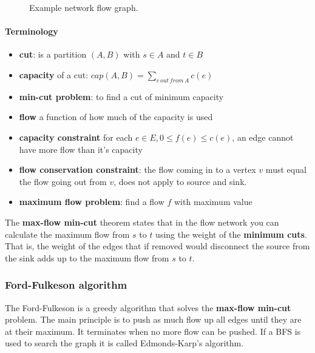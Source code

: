 \documentclass[12pt]{article} %
\begin{document}
\begin{figure}[H]
\caption{Example network flow graph.}
\label{flow}
\end{figure} 

\paragraph{Terminology}
\begin{itemize}
    \item \textbf{cut}: is a partition $(A, B)$ with $s \in A$ and $t \in B$
    \item \textbf{capacity} of a cut: $cap(A, B) = \sum_{e \, out \, from\, A} c(e)$
    \item \textbf{min-cut problem}: to find a cut of minimum capacity
    \item \textbf{flow} a function of how much of the capacity is used
    \item \textbf{capacity constraint} for each $e \in E, 0 \leq f(e) \leq c(e)$, an edge cannot have more flow than it's capacity
    \item \textbf{flow conservation constraint}: the flow coming in to a vertex $v$ must equal the flow going out from $v$, does not apply to source and sink.
    \item \textbf{maximum flow problem}: find a flow $f$ with maximum value
\end{itemize}

\par The \textbf{max-flow min-cut} theorem states that in the flow network you can calculate the maximum flow from $s$ to $t$ using the weight of the \textbf{minimum cuts}. That is, the weight of the edges that if removed would disconnect the source from the sink adds up to the maximum flow from $s$ to $t$.

\subsubsection{Ford-Fulkeson algorithm}
The Ford-Fulkeson is a greedy algorithm that solves the \textbf{max-flow min-cut} problem. The main principle is to push as much flow up all edges until they are at their maximum. It terminates when no more flow can be pushed. If a BFS is used to search the graph it is called Edmonds-Karp's algorithm.
\end{document}
